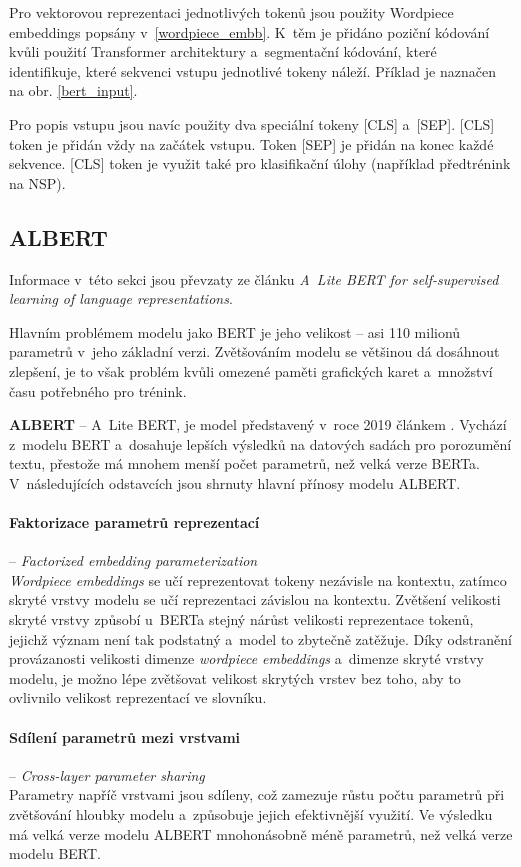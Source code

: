 Pro vektorovou reprezentaci jednotlivých tokenů jsou použity Wordpiece embeddings \cite{wordpiece} popsány v~\ref{wordpiece_embb}. K~těm je přidáno poziční kódování kvůli použití Transformer architektury a~segmentační kódování, které identifikuje, které sekvenci vstupu jednotlivé tokeny náleží. Příklad je naznačen na obr. \ref{bert_input}.\par
Pro popis vstupu jsou navíc použity dva speciální tokeny [CLS] a~[SEP]. [CLS] token je přidán vždy na začátek vstupu. Token [SEP] je přidán na konec každé sekvence. [CLS] token je využit také pro klasifikační úlohy (například předtrénink na NSP).

\subsection{ALBERT}
Informace v~této sekci jsou převzaty ze článku \cite{ALBERT} \emph{A~Lite BERT for self-supervised learning of language representations}.\par
Hlavním problémem modelu jako BERT je jeho velikost -- asi 110 milionů parametrů v~jeho základní verzi. Zvětšováním modelu se většinou dá dosáhnout zlepšení, je to však problém kvůli omezené paměti grafických karet a~množství času potřebného pro trénink.\par
\textbf{ALBERT} -- A~Lite BERT, je model představený v~roce 2019 článkem \cite{ALBERT}. Vychází z~modelu BERT a~dosahuje lepších výsledků na datových sadách pro porozumění textu, přestože má mnohem menší počet parametrů, než velká verze BERTa. V~následujících odstavcích jsou shrnuty hlavní přínosy modelu ALBERT.

\paragraph{Faktorizace parametrů reprezentací} -- \emph{Factorized embedding parameterization}\\ 
\emph{Wordpiece embeddings} se učí reprezentovat tokeny nezávisle na kontextu, zatímco skryté vrstvy modelu se učí reprezentaci závislou na kontextu. Zvětšení velikosti skryté vrstvy způsobí u~BERTa stejný nárůst velikosti reprezentace tokenů, jejichž význam není tak podstatný a~model to zbytečně zatěžuje.
Díky odstranění provázanosti velikosti dimenze \emph{wordpiece embeddings} a~dimenze skryté vrstvy modelu, je možno lépe zvětšovat velikost skrytých vrstev bez toho, aby to ovlivnilo velikost reprezentací ve slovníku.

\paragraph{Sdílení parametrů mezi vrstvami} -- \textit{Cross-layer parameter sharing}\\
Parametry napříč vrstvami jsou sdíleny, což zamezuje růstu počtu parametrů při zvětšování hloubky modelu a~způsobuje jejich efektivnější využití. Ve výsledku má velká verze modelu ALBERT mnohonásobně méně parametrů, než velká verze modelu BERT.

